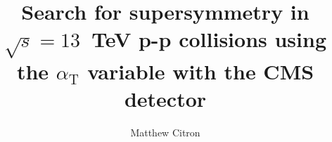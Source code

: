 \documentclass{mythesis}
\title{Search for supersymmetry in $\sqrt{s} = 13$~TeV p-p collisions
using the $\alpha_\text{T}$ variable with the CMS detector}
\author{Matthew Citron}
\begin{document}

\begin{frontmatter}
  
\end{frontmatter}

\begin{mainmatter}
% 
% 
% 

% 
% 
% 
% 
% 
% 
\end{mainmatter}

% 
% 

\begin{appendices}
  
\end{appendices}

\begin{backmatter}
 

\end{backmatter}

\end{document}
